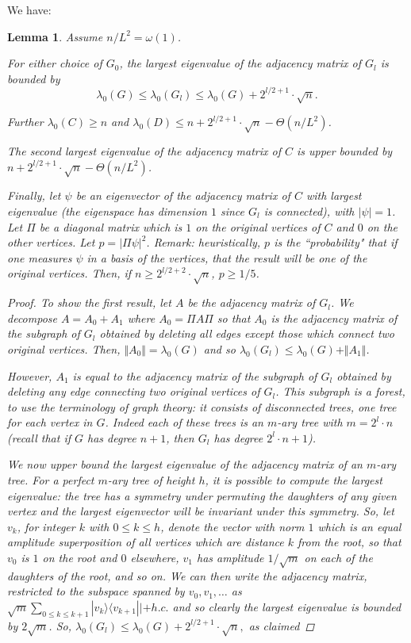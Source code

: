 \documentclass[letterpaper,onecolumn]{quantumarticle}
\newtheorem{lemma}{Lemma}
\newcommand{\glen}{L}
\begin{document}
We have:
\begin{lemma}
\label{eigbounddec}
Assume $n/\glen^2=\omega(1)$.

For either choice of $G_0$, the largest eigenvalue of the adjacency matrix of $G_l$ is bounded by
$$\lambda_0(G)\leq \lambda_0(G_l)\leq \lambda_0(G)+2^{l/2+1} \cdot \sqrt{n}.$$

Further $\lambda_0(C)\geq n$ and
 $\lambda_0(D)\leq n+2^{l/2+1} \cdot \sqrt{n}-\Theta(n/\glen^2)$.

The second largest eigenvalue of the adjacency matrix of $C$ is upper bounded by
$n+2^{l/2+1} \cdot \sqrt{n}-\Theta(n/\glen^2)$.

Finally, let $\psi$ be an eigenvector of the adjacency matrix of $C$ with largest eigenvalue (the eigenspace has dimension $1$ since $G_l$ is connected), with $|\psi|=1$.  
Let $\Pi$ be a diagonal matrix which is $1$ on the original vertices of $C$ and $0$ on the other vertices.
Let $p=|\Pi \psi|^2$.  Remark: heuristically, $p$ is the ``probability" that if one measures $\psi$ in a basis of the vertices, that the result will be one of the original vertices.
Then, if $n \geq 2^{l/2+2} \cdot \sqrt{n}$,
$p\geq 1/5$.
\begin{proof}
To show the first result,
let $A$ be the adjacency matrix of $G_l$.  We decompose $A=A_0+A_1$ where $A_0=\Pi A \Pi$ so that $A_0$ is the adjacency matrix of the subgraph of $G_l$ obtained by deleting all edges except those which connect two original vertices.  Then, $\Vert A_0 \Vert=\lambda_0(G)$ and so $\lambda_0(G_l)\leq \lambda_0(G)+\Vert A_1 \Vert$.

However, $A_1$ is equal to the adjacency matrix of the subgraph of $G_l$ obtained by deleting any edge connecting two original vertices of $G_l$.  This subgraph is a forest, to use the terminology of graph theory: it consists of disconnected trees, one tree for each vertex in $G$.  
Indeed each of these trees is an $m$-ary tree with $m=2^l\cdot n$ (recall that if $G$ has degree $n+1$, then $G_l$ has degree $2^{l}\cdot n+1$).

We now upper bound the largest eigenvalue of the adjacency matrix of an $m$-ary tree.
For a perfect $m$-ary tree of height $h$, it is possible to compute the largest eigenvalue: the tree has a symmetry under permuting the daughters of any given vertex and the largest eigenvector will be invariant under this symmetry.  So, let $v_k$, for integer $k$ with $0\leq k \leq h$, denote the vector with norm $1$ which is an equal amplitude superposition of all vertices which are distance $k$ from the root, so that $v_0$ is $1$ on the root and $0$ elsewhere, $v_1$ has amplitude $1/\sqrt{m}$ on each of the daughters of the root, and so on.  We can then write the adjacency matrix, restricted to the subspace spanned by $v_0,v_1,\ldots$ as
$\sqrt{m} \sum_{0\leq k \leq k+1} |v_k\rangle\langle v_{k+1}||+h.c.$ and so clearly the largest eigenvalue is bounded by $2\sqrt{m}$.
So, $\lambda_0(G_l)\leq \lambda_0(G)+2^{l/2+1} \cdot \sqrt{n},$ as claimed


\end{proof}
\end{lemma}
\end{document}
